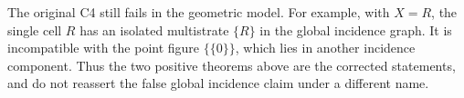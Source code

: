 The original C4 still fails in the geometric model. For example,
with \(X=R\), the single cell \(R\) has an isolated multistrate
\(\{R\}\) in the global incidence graph. It is incompatible
with the point figure \(\{\{0\}\}\), which lies in another
incidence component. Thus the two positive theorems above are
the corrected statements, and do not reassert the false global
incidence claim under a different name.
